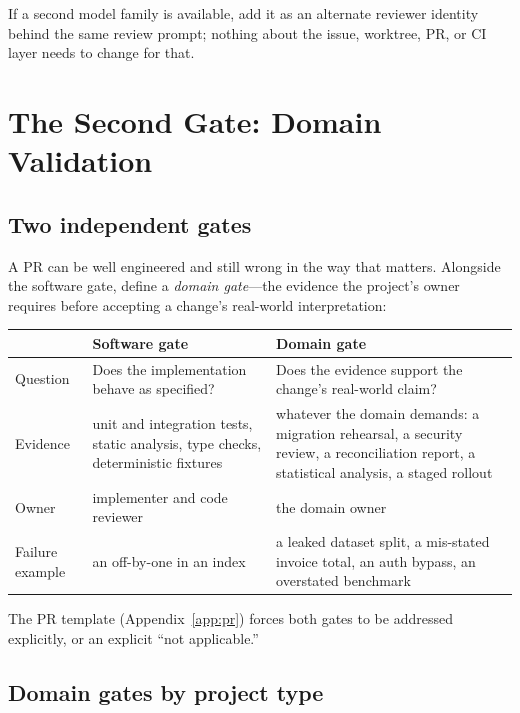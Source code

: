 \documentclass[11pt]{article}
\begin{document}
If a second model family is available, add it as an alternate reviewer identity behind the same
review prompt; nothing about the issue, worktree, PR, or CI layer needs to change for that.

\section{The Second Gate: Domain Validation}

\subsection{Two independent gates}

A PR can be well engineered and still wrong in the way that matters. Alongside the software gate,
define a \emph{domain gate}---the evidence the project's owner requires before accepting a
change's real-world interpretation:

\begin{center}
\begin{tabularx}{\textwidth}{@{}l Y Y@{}}
\toprule
& \textbf{Software gate} & \textbf{Domain gate} \\
\midrule
Question & Does the implementation behave as specified? & Does the evidence support the
  change's real-world claim? \\
Evidence & unit and integration tests, static analysis, type checks, deterministic fixtures &
  whatever the domain demands: a migration rehearsal, a security review, a reconciliation
  report, a statistical analysis, a staged rollout \\
Owner & implementer and code reviewer & the domain owner \\
Failure example & an off-by-one in an index & a leaked dataset split, a mis-stated invoice
  total, an auth bypass, an overstated benchmark \\
\bottomrule
\end{tabularx}
\end{center}

The PR template (Appendix~\ref{app:pr}) forces both gates to be addressed explicitly, or an
explicit ``not applicable.''

\subsection{Domain gates by project type}
\end{document}
